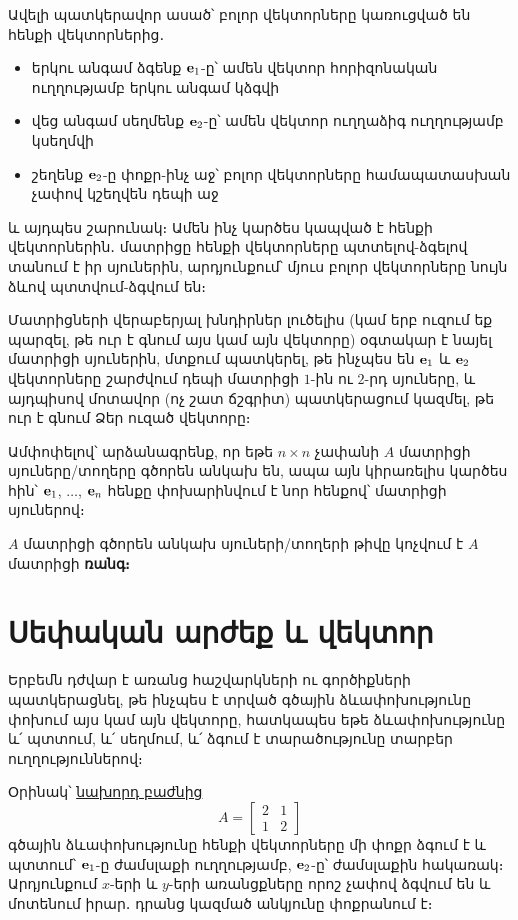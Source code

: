 Ավելի պատկերավոր ասած՝ բոլոր վեկտորները կառուցված են հենքի վեկտորներից․ 
\begin{itemize}
    \item երկու անգամ ձգենք $\mathbf{e}_1$-ը՝ ամեն վեկտոր հորիզոնական ուղղու\-թյամբ երկու անգամ կձգվի
    \item վեց անգամ սեղմենք $\mathbf{e}_2$-ը՝ ամեն վեկտոր ուղղաձիգ ուղղությամբ կսեղմվի
    \item շեղենք $\mathbf{e}_2$-ը փոքր-ինչ աջ՝ բոլոր վեկտորները համապատասխան չափով կշեղվեն դեպի աջ
\end{itemize}
և այդպես շարունակ։ Ամեն ինչ կարծես կապված է հենքի վեկտորներին․ մատրիցը հենքի վեկտորները պտտելով-ձգելով տանում է իր սյուներին, արդյունքում՝ մյուս բոլոր վեկտորները նույն ձևով պտտվում-ձգվում են։


Մատրիցների վերաբերյալ խնդիրներ լուծելիս (կամ երբ ուզում եք պարզել, թե ուր է գնում այս կամ այն վեկտորը) օգտակար է նայել մատրիցի սյուներին, մտքում պատկերել, թե ինչպես են $\mathbf{e}_1$ և $\mathbf{e}_2$ վեկտորները շարժվում դեպի մատրիցի $1$-ին ու $2$-րդ սյուները, և այդպիսով մոտավոր (ոչ շատ ճշգրիտ) պատկերացում կազմել, թե ուր է գնում Ձեր ուզած վեկտորը։

Ամփոփելով՝ արձանագրենք, որ եթե $n\times n$ չափանի $A$ մատրիցի սյուները/տողերը գծորեն անկախ են, ապա այն կիրառելիս կարծես հին՝ $\mathbf{e}_1$, $\dots$, $\mathbf{e}_n$ հենքը փոխարինվում է նոր հենքով՝ մատրիցի սյուներով։


\begin{definition}
$A$ մատրիցի գծորեն անկախ սյուների/տողերի թիվը կոչվում է $A$ մատրիցի \textbf{ռանգ։}
\end{definition}


\section{Սեփական արժեք և վեկտոր}

Երբեմն դժվար է առանց հաշվարկների ու գործիքների պատկերացնել, թե ինչպես է տրված գծային ձևափոխությունը փոխում այս կամ այն վեկտորը, հատկապես եթե ձևափոխությունը և՛ պտտում, և՛ սեղմում, և՛ ձգում է տարածությունը տարբեր ուղղություններով։ 

Օրինակ՝ \hyperref[matrix_A]{\color{OliveGreen} նախորդ բաժնից} 
\[
A = \begin{bmatrix}
    2 & 1 \\ 1 & 2
\end{bmatrix}
\]
գծային ձևափոխությունը հենքի վեկտորները մի փոքր ձգում է և պտտում՝ $\mathbf{e}_1$-ը ժամսլաքի ուղղությամբ, $\mathbf{e}_2$-ը՝ ժամսլաքին հակառակ։ Արդյունքում $x$-երի և $y$-երի առանցքները  որոշ չափով ձգվում են և մոտենում իրար․ դրանց կազմած անկյունը փոքրանում է։ 

